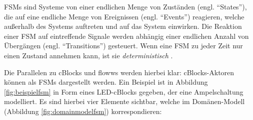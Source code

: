 \acp{FSM} sind Systeme von einer endlichen Menge von Zuständen (engl. "`States"'), die auf eine endliche Menge von Ereignissen (engl. "`Events"') reagieren, welche außerhalb des Systems auftreten und auf das System einwirken. Die Reaktion einer \ac{FSM} auf eintreffende Signale werden abhängig einer endlichen Anzahl von Übergängen (engl. "`Transitions"') gesteuert. Wenn eine \ac{FSM} zu jeder Zeit nur einen Zustand annehmen kann, ist sie \textit{deterministisch} \cite{hopcroft2013introduction}. 

Die Parallelen zu cBlocks und flowws werden hierbei klar: cBlocks-Aktoren können als \acp{FSM} dargestellt werden. Ein Beispiel ist in Abbildung \ref{fig:beispielfsm} in Form eines LED-cBlocks gegeben, der eine Ampelschaltung modelliert. Es sind hierbei vier Elemente sichtbar, welche im Domänen-Modell (Abbildung \ref{fig:domainmodelfsm}) korrespondieren:
